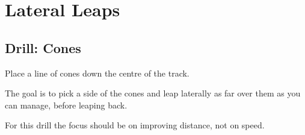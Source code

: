 \section{Lateral Leaps}
\label{sec:juke/lateral_leaps}



\subsection*{Drill: Cones} 
Place a line of cones down the centre of the track.

The goal is to pick a side of the cones and leap laterally as far over them as you can manage, before leaping back.    

For this drill the focus should be on improving distance, not on speed.



